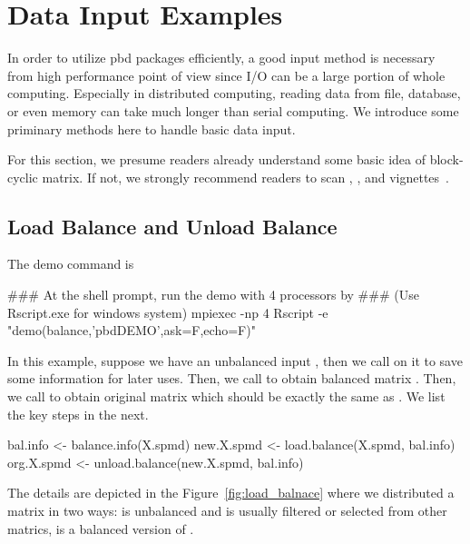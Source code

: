 
\section[Data Input Examples]{Data Input Examples}
\label{sec:data_input_examples}

In order to utilize pbd packages efficiently, a good input method is necessary
from high performance point of view since I/O can be a large portion
of whole computing. Especially in distributed computing, reading data
from file, database, or even memory can take much longer than serial
computing. We introduce some priminary methods here to handle basic
data input.

For this section, we presume readers already understand some basic idea
of block-cyclic matrix. If not, we strongly recommend readers to
scan , , and 
vignettes~\citep{Chen2012pbdSLAPvignette,Schmidt2012pbdBASEvignette,Schmidt2012pbdDMATvignette}.




\subsection[Load Balance and Unload Balance]{Load Balance and Unload Balance}
\label{sec:lb_ub}

The demo command is
\begin{Command}
### At the shell prompt, run the demo with 4 processors by
### (Use Rscript.exe for windows system)
mpiexec -np 4 Rscript -e "demo(balance,'pbdDEMO',ask=F,echo=F)"
\end{Command}
In this example, suppose we have an unbalanced input ,
then we call  on it to save some information for later uses.
Then, we call  to obtain balanced matrix
.
Then, we call  to obtain original matrix
 which should be exactly the same as .
We list the key steps in the next.
\begin{Code}[title=R Code]
bal.info <- balance.info(X.spmd)
new.X.spmd <- load.balance(X.spmd, bal.info)
org.X.spmd <- unload.balance(new.X.spmd, bal.info)
\end{Code}
The details are depicted in the Figure~\ref{fig:load_balnace}
where we distributed a matrix in two ways:
 is unbalanced and is usually filtered or
selected from other matrics,
 is a balanced version of .


